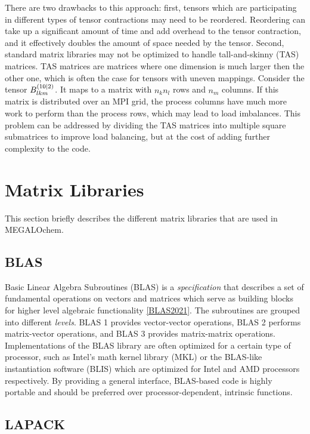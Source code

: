 There are two drawbacks to this approach: first, tensors which are participating in different types of tensor contractions may need to be reordered. Reordering can take up a significant amount of time and add overhead to the tensor contraction, and it effectively doubles the amount of space needed by the tensor. Second, standard matrix libraries may not be optimized to handle tall-and-skinny (TAS) matrices. TAS matrices are matrices where one dimension is much larger then the other one, which is often the case for tensors with uneven mappings. Consider the tensor  $B_{lkm}^{\left( 10 \mid 2 \right)}$. It maps to a matrix with $n_kn_l$ rows and $n_m$ columns. If this matrix is distributed over an MPI grid, the process columns have much more work to perform than the process rows, which may lead to load imbalances. This problem can be addressed by dividing the TAS matrices into multiple square submatrices to improve load balancing, but at the cost of adding further complexity to the code.

\section{Matrix Libraries}

This section briefly describes the different matrix libraries that are used in MEGALOchem.

\subsection{BLAS}

Basic Linear Algebra Subroutines (BLAS) is a \emph{specification} that describes a set of fundamental operations on vectors and matrices which serve as building blocks for higher level algebraic functionality \ref{BLAS2021}. The subroutines are grouped into different \emph{levels}. BLAS 1 provides vector-vector operations, BLAS 2 performs matrix-vector operations, and BLAS 3 provides matrix-matrix operations. Implementations of the BLAS library are often optimized for a certain type of processor, such as Intel's math kernel library (MKL) or the BLAS-like instantiation software (BLIS) which are optimized for Intel and AMD processors respectively. By providing a general interface, BLAS-based code is highly portable and should be preferred over processor-dependent, intrinsic functions. 

\subsection{LAPACK}

